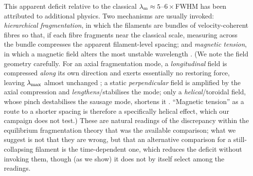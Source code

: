 \documentclass[usenatbib,twoside,twocolumn]{mnras}
\begin{document}
This apparent deficit relative to the classical $\lambda_{\rm m}\approx5$--$6\times$FWHM has been attributed to additional physics. Two mechanisms are usually invoked: \emph{hierarchical fragmentation}, in which the filaments are bundles of velocity-coherent fibres \citep{Hacar2013,Hacar2018,Yang2024} so that, if each fibre fragments near the classical scale, measuring across the bundle compresses the apparent filament-level spacing; and \emph{magnetic tension}, in which a magnetic field alters the most unstable wavelength \citep{Nakamura1993}. (We note the field geometry carefully. For an axial fragmentation mode, a \emph{longitudinal} field is compressed \emph{along} its own direction and exerts essentially no restoring force, leaving $\lambda_{\rm max}$ almost unchanged \citep[][consistent with our $\theta=0^\circ$ runs being nearly $\beta$-independent]{Nagasawa1987,Nakamura1993}; a static \emph{perpendicular} field is amplified by the axial compression and \emph{lengthens}/stabilises the mode; only a \emph{helical}/toroidal field, whose pinch destabilises the sausage mode, shortens it \citep{Fiege2000}. ``Magnetic tension'' as a route to a shorter spacing is therefore a specifically helical effect, which our campaign does not test.) These are natural readings of the discrepancy within the equilibrium fragmentation theory that was the available comparison; what we suggest is not that they are wrong, but that an alternative comparison for a still-collapsing filament is the time-dependent one, which reduces the deficit without invoking them, though (as we show) it does not by itself select among the readings.
\end{document}
